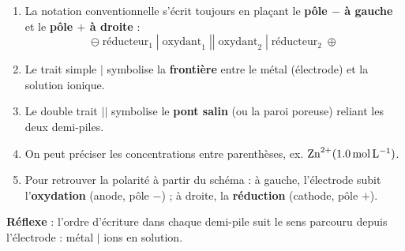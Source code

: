 \documentclass[11pt]{article}
\begin{document}
\begin{methode}
\begin{enumerate}
\item La notation conventionnelle s'écrit toujours en plaçant le \textbf{pôle $-$ à gauche} et le \textbf{pôle $+$ à droite} :
\[ \ominus \; \text{réducteur}_1 \; | \; \text{oxydant}_1 \; || \; \text{oxydant}_2 \; | \; \text{réducteur}_2 \; \oplus \]
\item Le trait simple $|$ symbolise la \textbf{frontière} entre le métal (électrode) et la solution ionique.
\item Le double trait $||$ symbolise le \textbf{pont salin} (ou la paroi poreuse) reliant les deux demi-piles.
\item On peut préciser les concentrations entre parenthèses, ex. $\ce{Zn^2+}(\SI{1,0}{mol.L^{-1}})$.
\item Pour retrouver la polarité à partir du schéma : à gauche, l'électrode subit l'\textbf{oxydation} (anode, pôle $-$) ; à droite, la \textbf{réduction} (cathode, pôle $+$).
\end{enumerate}
\textbf{Réflexe} : l'ordre d'écriture dans chaque demi-pile suit le sens parcouru depuis l'électrode : métal $|$ ions en solution.
\end{methode}
\end{document}
